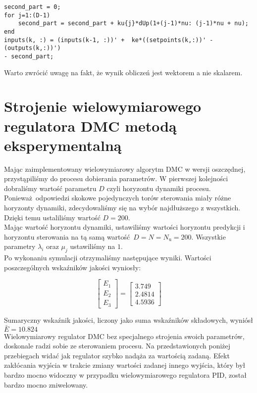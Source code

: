 \begin{lstlisting}[style=custommatlab,frame=single,label={pro_pid_parametry},caption={Obliczanie nowych sterowań w wielowymiarowym algorytmie DMC},captionpos=b]
% obliczenie nowych sterowan
second_part = 0;
for j=1:(D-1)
    second_part = second_part + ku{j}*dUp(1+(j-1)*nu: (j-1)*nu + nu);  
end
inputs(k, :) = (inputs(k-1, :))' +  ke*((setpoints(k,:))' - (outputs(k,:))')
- second_part; 
\end{lstlisting}

Warto zwrócić uwagę na fakt, że wynik obliczeń jest wektorem a nie skalarem.

\section{Strojenie wielowymiarowego regulatora DMC metodą eksperymentalną}
\label{pro_dmc_strojenie}
Mając zaimplementowany wielowymiarowy algorytm DMC w wersji oszczędnej, przystąpiliśmy
do procesu dobierania parametrów. W pierwszej kolejności dobraliśmy wartość parametru $D$ 
czyli horyzontu dynamiki procesu. Ponieważ odpowiedzi skokowe pojedynczych torów sterowania
miały różne horyzonty dynamiki, zdecydowaliśmy się na wybór najdłuższego z wszystkich.
Dzięki temu ustaliliśmy wartość $D = \num{200}$.\\

Mając wartość horyzontu dynamiki, ustawiliśmy wartości horyzontu predykcji i horyzontu
sterowania na tą samą wartość $D = N = N_{\mathrm{u}} = \num{200}$. Wszystkie parametry
$\lambda_{i}$ oraz $\mu_{j}$ ustawiliśmy na $\num{1}$. \\

Po wykonaniu symulacji otrzymaliśmy następujące wyniki. Wartości poszczególnych
wskaźników jakości wyniosły:

\[
\begin{bmatrix}
    E_{\mathrm{1}} \\
    E_{\mathrm{2}} \\
    E_{\mathrm{3}} 
\end{bmatrix}
= 
\begin{bmatrix}
    \num{3.749} \\
    \num{2.4814} \\
    \num{4.5936}
\end{bmatrix}
\]

Sumaryczny wskaźnik jakości, liczony jako suma wskaźników składowych, 
wyniósł $\bar{E} = \num{10.824}$\\

Wielowymiarowy regulator DMC bez specjalnego strojenia swoich parametrów, doskonale
radzi sobie ze sterowaniem procesu. Na przedstawionych poniżej przebiegach widać
jak regulator szybko nadąża za wartością zadaną. Efekt zakłócania wyjścia w trakcie
zmiany wartości zadanej innego wyjścia, który był bardzo mocno widoczny w przypadku
wielowymiarowego regulatora PID, został bardzo mocno zniwelowany.

